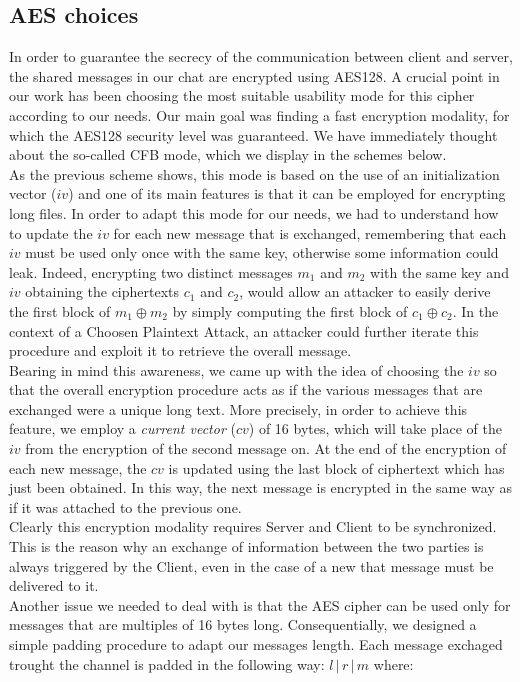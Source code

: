 \documentclass[12pt]{article}
\begin{document}
\subsection*{AES choices}
In order to guarantee the secrecy of the communication between client and server, the shared messages in our chat are encrypted using AES128. A crucial point in our work has been choosing the most suitable usability mode for this cipher according to our needs. Our main goal was finding a fast encryption modality, for which the AES128 security level was guaranteed. We have immediately thought about the so-called CFB mode, which we display in the schemes below.\\
As the previous scheme shows, this mode is based on the use of an initialization vector ($iv$) and one of its main features is that it can be employed for encrypting long files. In order to adapt this mode for our needs, we had to understand how to update the $iv$ for each new message that is exchanged, remembering that each $iv$ must be used only once with the same key, otherwise some information could leak. Indeed, encrypting two distinct messages $m_1$ and $m_2$ with the same key and $iv$ obtaining the ciphertexts $c_1$ and $c_2$, would allow an attacker to easily derive the first block of $m_1\oplus m_2$ by simply computing the first block of $c_1\oplus c_2$. In the context of a Choosen Plaintext Attack, an attacker could further iterate this procedure and exploit it to retrieve the overall message.\\ Bearing in mind this awareness, we came up with the idea of choosing the $iv$ so that the overall encryption procedure acts as if the various messages that are exchanged were a unique long text. More precisely, in order to achieve this feature, we employ a {\em current vector} ($cv$) of 16 bytes, which will take place of the $iv$ from the encryption of the second message on. At the end of the encryption of each new message, the $cv$ is updated using the last block of ciphertext which has just been obtained. In this way, the next message is encrypted in the same way as if it was attached to the previous one. \\ 
Clearly this encryption modality requires Server and Client to be synchronized. This is the reason why an exchange of information between the two parties is always triggered by the Client, even in the case of a new that message must be delivered to it.\\
Another issue we needed to deal with is that the AES cipher can be used only for messages that are multiples of 16 bytes long. Consequentially, we designed a simple padding procedure to adapt our messages length. Each message exchaged trought the channel is padded in the following way: $l \, | \, r \, | \, m$ where:
\end{document}
